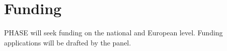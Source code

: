 \section{Funding}
\label{sec:funding}
PHASE will seek funding on the national and European level. Funding applications will be drafted by the panel.